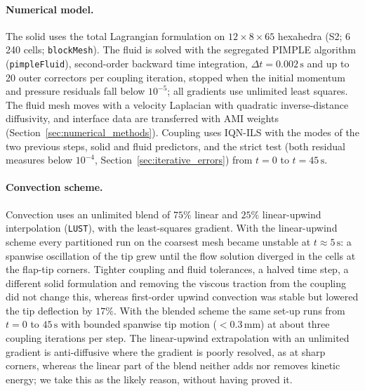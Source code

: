 \paragraph{Numerical model.}
The solid uses the total Lagrangian formulation on $12 \times 8 \times 65$ hexahedra (S2; 6\,240 cells; \texttt{blockMesh}).
The fluid is solved with the segregated PIMPLE algorithm (\texttt{pimpleFluid}), second-order backward time integration, $\Delta t = 0.002\,\mathrm{s}$ and up to 20 outer correctors per coupling iteration, stopped when the initial momentum and pressure residuals fall below $10^{-5}$; all gradients use unlimited least squares.
The fluid mesh moves with a velocity Laplacian with quadratic inverse-distance diffusivity, and interface data are transferred with AMI weights (Section~\ref{sec:numerical_methods}).
Coupling uses IQN-ILS with the modes of the two previous steps, solid and fluid predictors, and the strict test (both residual measures below $10^{-4}$, Section~\ref{sec:iterative_errors}) from $t = 0$ to $t = 45\,\mathrm{s}$.

\paragraph{Convection scheme.}
Convection uses an unlimited blend of $75\%$ linear and $25\%$ linear-upwind interpolation (\texttt{LUST}), with the least-squares gradient.
With the linear-upwind scheme every partitioned run on the coarsest mesh became unstable at $t \approx 5\,\mathrm{s}$: a spanwise oscillation of the tip grew until the flow solution diverged in the cells at the flap-tip corners. Tighter coupling and fluid tolerances, a halved time step, a different solid formulation and removing the viscous traction from the coupling did not change this, whereas first-order upwind convection was stable but lowered the tip deflection by $17\%$. With the blended scheme the same set-up runs from $t = 0$ to $45\,\mathrm{s}$ with bounded spanwise tip motion ($< 0.3\,\mathrm{mm}$) at about three coupling iterations per step.
The linear-upwind extrapolation with an unlimited gradient is anti-diffusive where the gradient is poorly resolved, as at sharp corners, whereas the linear part of the blend neither adds nor removes kinetic energy; we take this as the likely reason, without having proved it.

